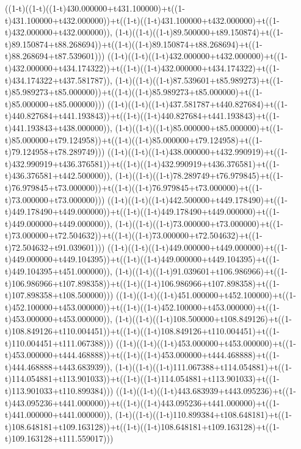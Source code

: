 ((1-t)((1-t)((1-t)430.000000+t431.100000)+t((1-t)431.100000+t432.000000))+t((1-t)((1-t)431.100000+t432.000000)+t((1-t)432.000000+t432.000000)),                                     (1-t)((1-t)((1-t)89.500000+t89.150874)+t((1-t)89.150874+t88.268694))+t((1-t)((1-t)89.150874+t88.268694)+t((1-t)88.268694+t87.539601)))
((1-t)((1-t)((1-t)432.000000+t432.000000)+t((1-t)432.000000+t434.174322))+t((1-t)((1-t)432.000000+t434.174322)+t((1-t)434.174322+t437.581787)),                                     (1-t)((1-t)((1-t)87.539601+t85.989273)+t((1-t)85.989273+t85.000000))+t((1-t)((1-t)85.989273+t85.000000)+t((1-t)85.000000+t85.000000)))
((1-t)((1-t)((1-t)437.581787+t440.827684)+t((1-t)440.827684+t441.193843))+t((1-t)((1-t)440.827684+t441.193843)+t((1-t)441.193843+t438.000000)),                                     (1-t)((1-t)((1-t)85.000000+t85.000000)+t((1-t)85.000000+t79.124958))+t((1-t)((1-t)85.000000+t79.124958)+t((1-t)79.124958+t78.289749)))
((1-t)((1-t)((1-t)438.000000+t432.990919)+t((1-t)432.990919+t436.376581))+t((1-t)((1-t)432.990919+t436.376581)+t((1-t)436.376581+t442.500000)),                                     (1-t)((1-t)((1-t)78.289749+t76.979845)+t((1-t)76.979845+t73.000000))+t((1-t)((1-t)76.979845+t73.000000)+t((1-t)73.000000+t73.000000)))
((1-t)((1-t)((1-t)442.500000+t449.178490)+t((1-t)449.178490+t449.000000))+t((1-t)((1-t)449.178490+t449.000000)+t((1-t)449.000000+t449.000000)),                                     (1-t)((1-t)((1-t)73.000000+t73.000000)+t((1-t)73.000000+t72.504632))+t((1-t)((1-t)73.000000+t72.504632)+t((1-t)72.504632+t91.039601)))
((1-t)((1-t)((1-t)449.000000+t449.000000)+t((1-t)449.000000+t449.104395))+t((1-t)((1-t)449.000000+t449.104395)+t((1-t)449.104395+t451.000000)),                                     (1-t)((1-t)((1-t)91.039601+t106.986966)+t((1-t)106.986966+t107.898358))+t((1-t)((1-t)106.986966+t107.898358)+t((1-t)107.898358+t108.500000)))
((1-t)((1-t)((1-t)451.000000+t452.100000)+t((1-t)452.100000+t453.000000))+t((1-t)((1-t)452.100000+t453.000000)+t((1-t)453.000000+t453.000000)),                                     (1-t)((1-t)((1-t)108.500000+t108.849126)+t((1-t)108.849126+t110.004451))+t((1-t)((1-t)108.849126+t110.004451)+t((1-t)110.004451+t111.067388)))
((1-t)((1-t)((1-t)453.000000+t453.000000)+t((1-t)453.000000+t444.468888))+t((1-t)((1-t)453.000000+t444.468888)+t((1-t)444.468888+t443.683939)),                                     (1-t)((1-t)((1-t)111.067388+t114.054881)+t((1-t)114.054881+t113.901033))+t((1-t)((1-t)114.054881+t113.901033)+t((1-t)113.901033+t110.899384)))
((1-t)((1-t)((1-t)443.683939+t443.095236)+t((1-t)443.095236+t441.000000))+t((1-t)((1-t)443.095236+t441.000000)+t((1-t)441.000000+t441.000000)),                                     (1-t)((1-t)((1-t)110.899384+t108.648181)+t((1-t)108.648181+t109.163128))+t((1-t)((1-t)108.648181+t109.163128)+t((1-t)109.163128+t111.559017)))
